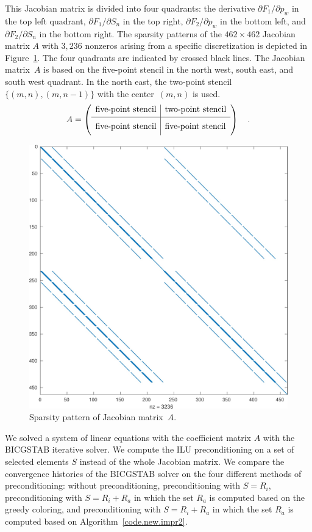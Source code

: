 \documentclass[12pt, twoside,a4paper,toc=bibliography]{scrbook}
\newcommand{\figref}[1]{Figure~\protect\ref{#1}}
\newcommand{\coderef}[1]{Algorithm~\protect\ref{#1}}
\begin{document}
This Jacobian matrix is divided into four quadrants: the derivative $\partial F_1 / \partial p_w$ in the top left quadrant, $\partial F_1 / \partial S_n$ in the top right, $\partial F_2 / \partial p_w$ in the bottom left, and $\partial F_2 / \partial S_n$ in the bottom right. The sparsity patterns of the $462 \times 462$ Jacobian matrix $A$
with $3,236$ nonzeros arising from a specific discretization is depicted in \figref{f:geophysik_J_matrices}.
The four quadrants are indicated by crossed black lines. The Jacobian matrix~$A$ is based on the five-point stencil in the north west, south east, and south west quadrant. In the north east, the two-point stencil~$\{(m,n), (m,n-1)\}$ with the center~$(m,n)$ is used.
$$
A =
\left({\begin{array}{l|l}
	\text{five-point stencil} & \text{two-point stencil} \\[0.25em]
	\hline
	\text{five-point stencil} \rule[-7.5pt]{0pt}{21pt} & \text{five-point stencil} \\
 \end{array}} \right)
\quad.
$$

\begin{figure}%
	\footnotesize
	\centering
         \includegraphics[width=0.6\linewidth]{co2_jac}
\caption{Sparsity pattern of Jacobian matrix~$A$.}%
\label{f:geophysik_J_matrices}
\end{figure}

We solved a system of linear equations with the
coefficient matrix $A$ with the BICGSTAB iterative solver.
We compute the ILU preconditioning on a set of selected elements $S$
instead of the whole Jacobian matrix. 
We compare the convergence histories of the BICGSTAB solver 
on the four different methods of preconditioning:
without preconditioning,
preconditioning with $S=R_i$,
preconditioning with $S=R_i + R_a$ in which 
the set $R_a$ is computed based on the greedy coloring,
and preconditioning with $S=R_i + R_a$ in which 
the set $R_a$ is computed based on \coderef{code.new.impr2}.
\end{document}
